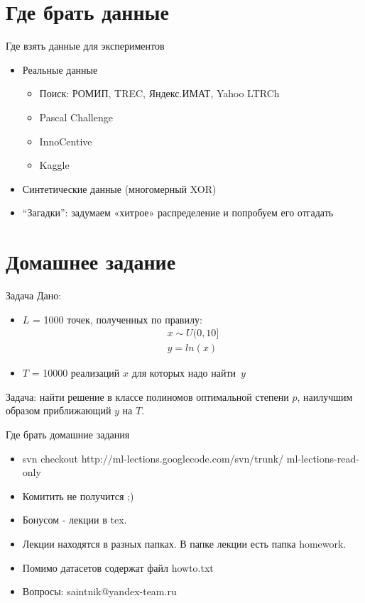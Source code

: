 \documentclass[14pt, fleqn, xcolor={dvipsnames, table}]{beamer}
\begin{document}
\section{Где брать данные}
\begin{frame}{Где взять данные для экспериментов}
\begin{itemize}
  \item Реальные данные
  \begin{itemize}
    \item Поиск: РОМИП, TREC, Яндекс.ИМАТ, Yahoo LTRCh
    \item Pascal Challenge
    \item InnoCentive
    \item Kaggle
  \end{itemize}
  \item Синтетические данные (многомерный XOR)
  \item ``Загадки'': задумаем «хитрое» распределение и попробуем его отгадать
\end{itemize}
\end{frame}

\section{Домашнее задание}
\begin{frame}{Задача}
Дано:
\begin{itemize}
  \item $L$ = 1000 точек, полученных по правилу:
$$\begin{array}{l}
x \sim U (0,10] \\
y = ln(x)
\end{array}$$
  \item $T$ = 10000 реализаций $x$ для которых надо найти~$y$
\end{itemize}
Задача: найти решение в классе полиномов оптимальной степени $p$, наилучшим образом приближающий $y$ на $T$.

\end{frame}

\begin{frame}{Где брать домашние задания}
\begin{itemize}
  \item svn checkout http://ml-lections.googlecode.com/svn/trunk/ ml-lections-read-only
  \item Комитить не получится ;)
  \item Бонусом - лекции в tex.
  \item Лекции находятся в разных папках. В папке лекции есть папка homework.
  \item Помимо датасетов содержат файл howto.txt
  \item Вопросы: saintnik@yandex-team.ru
\end{itemize}

\end{frame}
\end{document}
